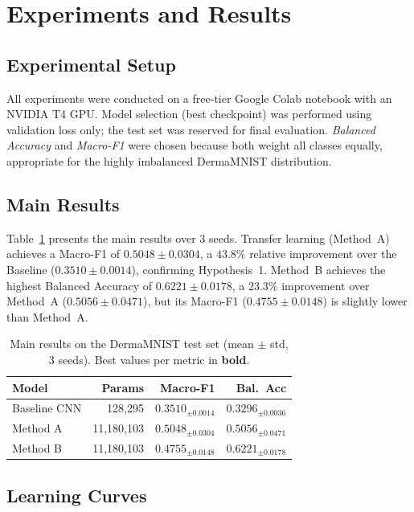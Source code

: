 \documentclass[conference]{IEEEtran}
\begin{document}
\section{Experiments and Results}

\subsection{Experimental Setup}
All experiments were conducted on a free-tier Google Colab notebook
with an NVIDIA T4 GPU. Model selection (best checkpoint) was
performed using validation loss only; the test set was reserved for
final evaluation. \textit{Balanced Accuracy} and \textit{Macro-F1}
were chosen because both weight all classes equally, appropriate for
the highly imbalanced DermaMNIST distribution.

\subsection{Main Results}

Table~\ref{tab:results} presents the main results over 3 seeds.
Transfer learning (Method~A) achieves a Macro-F1 of
$0.5048 \pm 0.0304$, a $43.8\%$ relative improvement over the
Baseline ($0.3510 \pm 0.0014$), confirming Hypothesis~1. Method~B
achieves the highest Balanced Accuracy of $0.6221 \pm 0.0178$,
a $23.3\%$ improvement over Method~A ($0.5056 \pm 0.0471$), but its
Macro-F1 ($0.4755 \pm 0.0148$) is slightly lower than Method~A.

\begin{table}[ht]
\centering
\caption{Main results on the DermaMNIST test set (mean $\pm$ std, 3 seeds).
Best values per metric in \textbf{bold}.}
\label{tab:results}
\begin{tabular}{lrrr}
\toprule
\textbf{Model} & \textbf{Params} & \textbf{Macro-F1} & \textbf{Bal.\ Acc} \\
\midrule
Baseline CNN & 128,295     & $0.3510_{\pm 0.0014}$ & $0.3296_{\pm 0.0036}$ \\
Method A     & 11,180,103  & $\mathbf{0.5048}_{\pm 0.0304}$ & $0.5056_{\pm 0.0471}$ \\
Method B     & 11,180,103  & $0.4755_{\pm 0.0148}$ & $\mathbf{0.6221}_{\pm 0.0178}$ \\
\bottomrule
\end{tabular}
\end{table}

\subsection{Learning Curves}
\end{document}
